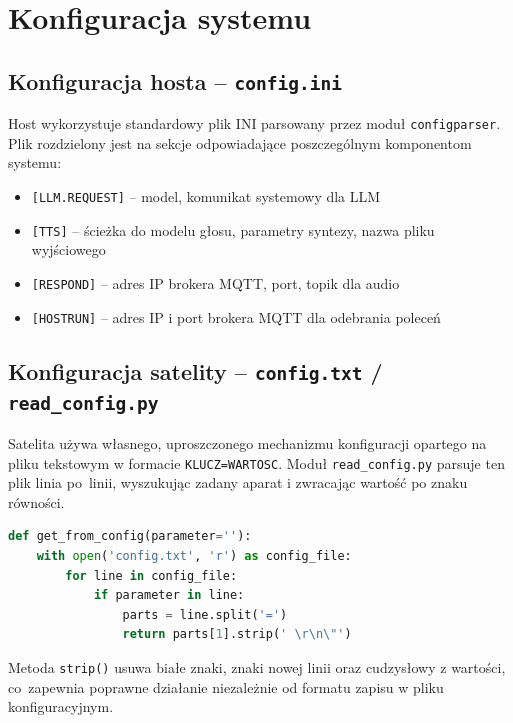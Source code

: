 \documentclass[12pt,a4paper]{article}
\begin{document}
\newpage

\section{Konfiguracja systemu}

\subsection{Konfiguracja hosta – \texttt{config.ini}}
Host wykorzystuje standardowy plik INI parsowany przez moduł \texttt{configparser}. Plik rozdzielony jest na sekcje odpowiadające poszczególnym komponentom systemu:
\begin{itemize}
    \item \texttt{[LLM.REQUEST]} – model, komunikat systemowy dla LLM
    \item \texttt{[TTS]} – ścieżka do modelu głosu, parametry syntezy, nazwa pliku wyjściowego
    \item \texttt{[RESPOND]} – adres IP brokera MQTT, port, topik dla audio
    \item \texttt{[HOSTRUN]} – adres IP i port brokera MQTT dla odebrania poleceń
\end{itemize}

\subsection{Konfiguracja satelity – \texttt{config.txt} / \texttt{read\_config.py}}
Satelita używa własnego, uproszczonego mechanizmu konfiguracji opartego na pliku tekstowym w formacie \texttt{KLUCZ=WARTOSC}. Moduł \texttt{read\_config.py} parsuje ten plik linia po~linii, wyszukując zadany aparat i zwracając wartość po znaku równości.

\begin{center}
\begin{minipage}{0.85\textwidth}
\begin{lstlisting}[language=Python]
def get_from_config(parameter=''):
    with open('config.txt', 'r') as config_file:
        for line in config_file:
            if parameter in line:
                parts = line.split('=')
                return parts[1].strip(' \r\n\"')
\end{lstlisting}
\end{minipage}
\end{center}

Metoda \texttt{strip()} usuwa białe znaki, znaki nowej linii oraz cudzysłowy z wartości, co~zapewnia poprawne działanie niezależnie od formatu zapisu w pliku konfiguracyjnym.
\end{document}

